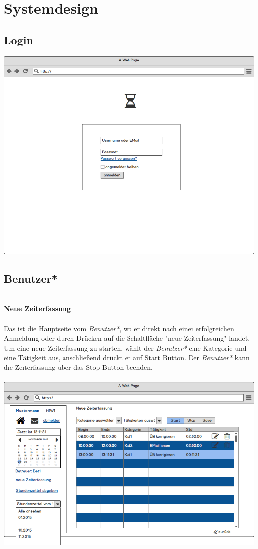 \section{Systemdesign}

\subsection{Login}
\includegraphics[width=\linewidth]{UI/Login/Login.png}

\newpage
\subsection{Benutzer*}

\textbf{\\Neue Zeiterfassung}\\
\\
Das ist die Hauptseite vom \emph{Benutzer*}, wo er direkt nach einer erfolgreichen Anmeldung oder durch Drücken auf die Schaltfläche "neue Zeiterfassung" landet. \\
Um eine neue Zeiterfassung zu starten, wählt der \emph{Benutzer*} eine Kategorie und eine Tätigkeit aus, anschließend drückt er auf Start Button. Der \emph{Benutzer*} kann die Zeiterfassung über das Stop Button beenden.\\
\\
\includegraphics[width=\linewidth]{UI/Benutzer/Zeiterfassung.png}

